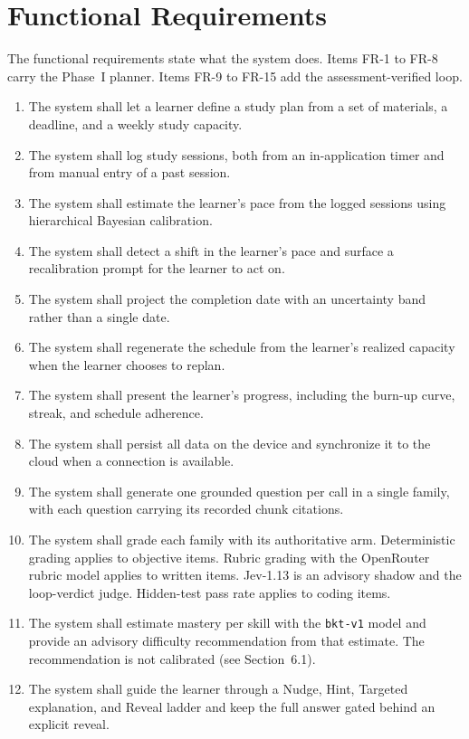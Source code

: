 \section{Functional Requirements}
The functional requirements state what the system does. Items FR-1 to FR-8 carry the Phase~I planner. Items FR-9 to FR-15 add the assessment-verified loop.
\begin{enumerate}[label=\textbf{FR-\arabic*},noitemsep,leftmargin=*]
    \item The system shall let a learner define a study plan from a set of materials, a deadline, and a weekly study capacity.
    \item The system shall log study sessions, both from an in-application timer and from manual entry of a past session.
    \item The system shall estimate the learner's pace from the logged sessions using hierarchical Bayesian calibration.
    \item The system shall detect a shift in the learner's pace and surface a recalibration prompt for the learner to act on.
    \item The system shall project the completion date with an uncertainty band rather than a single date.
    \item The system shall regenerate the schedule from the learner's realized capacity when the learner chooses to replan.
    \item The system shall present the learner's progress, including the burn-up curve, streak, and schedule adherence.
    \item The system shall persist all data on the device and synchronize it to the cloud when a connection is available.
    \item The system shall generate one grounded question per call in a single family, with each question carrying its recorded chunk citations.
    \item The system shall grade each family with its authoritative arm. Deterministic grading applies to objective items. Rubric grading with the OpenRouter rubric model applies to written items. Jev-1.13 is an advisory shadow and the loop-verdict judge. Hidden-test pass rate applies to coding items.
    \item The system shall estimate mastery per skill with the \texttt{bkt-v1} model and provide an advisory difficulty recommendation from that estimate. The recommendation is not calibrated (see Section~6.1).
    \item The system shall guide the learner through a Nudge, Hint, Targeted explanation, and Reveal ladder and keep the full answer gated behind an explicit reveal.

\end{enumerate}
